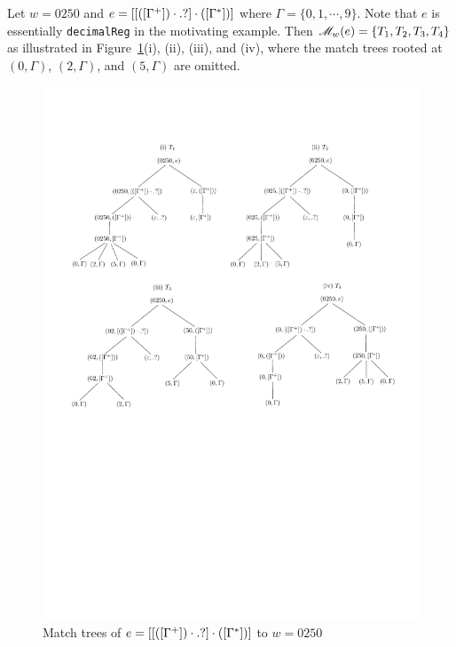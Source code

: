 \begin{example}\label{exmp-regex-match-tree}
Let $w= 0250$ and $e = [[([\Gamma^+])\cdot .?] \cdot ([\Gamma^*])]$ where $\Gamma = \{0,1,\cdots,9\}$. Note that $e$ is essentially {\tt decimalReg} in the motivating example. Then $\mathscr{M}_{w}(e) = \{T_1,T_2,T_3, T_4\}$ as illustrated in Figure~\ref{fig-regex-semantics-decimal}(i), (ii), (iii), and (iv), where the match trees rooted at $(0, \Gamma)$, $(2, \Gamma)$, and $(5, \Gamma)$ are omitted. %
\begin{figure}[htb]
\centering
\includegraphics[width=1\textwidth]{regex-semantics-decimal.pdf}
\caption{Match trees of $e=[[([\Gamma^+])\cdot .?] \cdot ([\Gamma^*])]$ to $w= 0250$}
\label{fig-regex-semantics-decimal}
\end{figure}
 \end{example}



